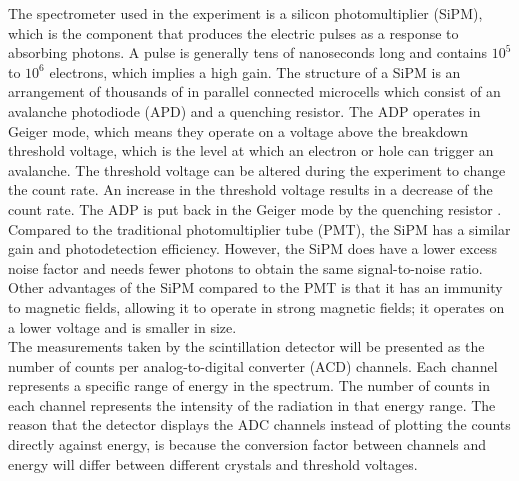 \documentclass[a4paper, 11pt, table]{article}
\begin{document}

The spectrometer used in the experiment is a silicon photomultiplier (SiPM), which is the component that produces the electric pulses as a response to absorbing photons. A pulse is generally tens of nanoseconds long and contains $10^5$ to $10^6$ electrons, which implies a high gain.
The structure of a SiPM is an arrangement of thousands of in parallel connected microcells which consist of an avalanche photodiode (APD) and a quenching resistor. The ADP operates in Geiger mode, which means they operate on a voltage above the breakdown threshold voltage, which is the level at which an electron or hole can trigger an avalanche. The threshold voltage can be altered during the experiment to change the count rate. An increase in the threshold voltage results in a decrease of the count rate. The ADP is put back in the Geiger mode by the quenching resistor \cite{kk_2016_what}.\\

Compared to the traditional photomultiplier tube (PMT), the SiPM has a similar gain and photodetection efficiency. However, the SiPM does have a lower excess noise factor and needs fewer photons to obtain the same signal-to-noise ratio. Other advantages of the SiPM compared to the PMT is that it has an immunity to magnetic fields, allowing it to operate in strong magnetic fields; it operates on a lower voltage and is smaller in size. \cite{WAGATSUMA2017203}\\

The measurements taken by the scintillation detector will be presented as the number of counts per analog-to-digital converter (ACD) channels. Each channel represents a specific range of energy in the spectrum. The number of counts in each channel represents the intensity of the radiation in that energy range. The reason that the detector displays the ADC channels instead of plotting the counts directly against energy, is because the conversion factor between channels and energy will differ between different crystals and threshold voltages.
\end{document}
